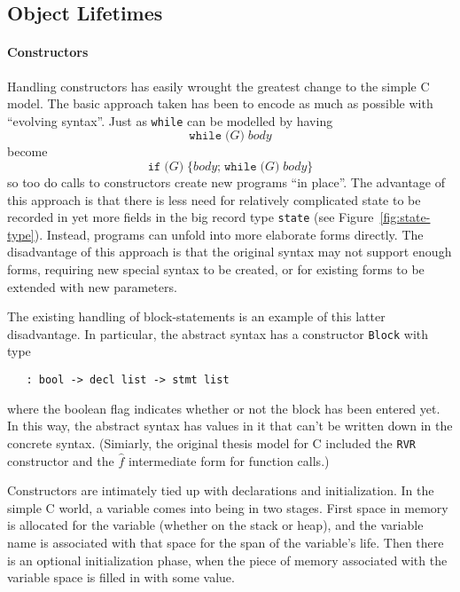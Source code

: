 \documentclass[11pt]{article}
\begin{document}
\subsection{Object Lifetimes}
\label{sec:object-lifetimes}

\paragraph{Constructors}
Handling constructors has easily wrought the greatest change to the
simple C model.  The basic approach taken has been to encode as much
as possible with ``evolving syntax''.  Just as \texttt{while} can be
modelled by having
\[
\texttt{while}\;\texttt{(}G\texttt{)}\;\mathit{body}
\] become \[
\texttt{if}\;\texttt{(}G\texttt{)}\;\texttt{\{}\mathit{body}\texttt{;}\;\texttt{while}\;\texttt{(}G\texttt{)}\;\mathit{body} \texttt{\}}
\]
so too do calls to \cpp{} constructors create new programs ``in
place''.  The advantage of this approach is that there is less need
for relatively complicated state to be recorded in yet more fields in
the big record type \texttt{state} (see Figure~\ref{fig:state-type}).
Instead, programs can unfold into more elaborate forms directly.  The
disadvantage of this approach is that the original syntax may not
support enough forms, requiring new special syntax to be created, or
for existing forms to be extended with new parameters.

The existing handling of block-statements is an example of this latter
disadvantage.  In particular, the abstract syntax has a constructor
\texttt{Block} with type
\begin{verbatim}
   : bool -> decl list -> stmt list
\end{verbatim}
where the boolean flag indicates whether or not the block has been
entered yet.  In this way, the abstract syntax has values in it that
can't be written down in the concrete syntax.  (Simiarly, the original
thesis model for C included the \texttt{RVR} constructor and the
$\hat{f}$ intermediate form for function calls.)

Constructors are intimately tied up with declarations and
initialization.  In the simple C world, a variable comes into being in
two stages.  First space in memory is allocated for the variable
(whether on the stack or heap), and the variable name is associated
with that space for the span of the variable's life.  Then there is an
optional initialization phase, when the piece of memory associated
with the variable space is filled in with some value.
\end{document}
